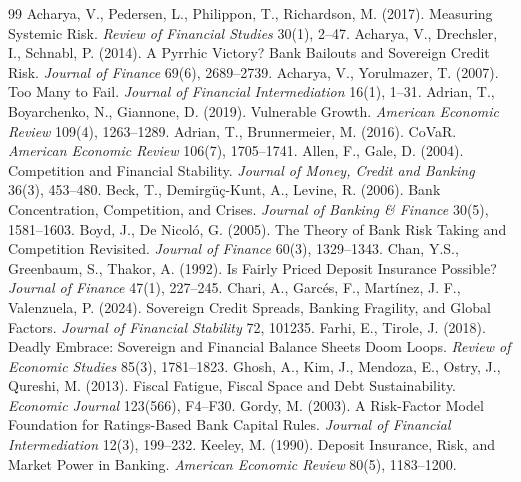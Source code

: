 \begin{thebibliography}{99}
\sloppy\small
{} Acharya, V., Pedersen, L., Philippon, T., Richardson, M. (2017). Measuring Systemic Risk. \textit{Review of Financial Studies} 30(1), 2--47.
 Acharya, V., Drechsler, I., Schnabl, P. (2014). A Pyrrhic Victory? Bank Bailouts and Sovereign Credit Risk. \textit{Journal of Finance} 69(6), 2689--2739.
 Acharya, V., Yorulmazer, T. (2007). Too Many to Fail. \textit{Journal of Financial Intermediation} 16(1), 1--31.
 Adrian, T., Boyarchenko, N., Giannone, D. (2019). Vulnerable Growth. \textit{American Economic Review} 109(4), 1263--1289.
 Adrian, T., Brunnermeier, M. (2016). CoVaR. \textit{American Economic Review} 106(7), 1705--1741.
 Allen, F., Gale, D. (2004). Competition and Financial Stability. \textit{Journal of Money, Credit and Banking} 36(3), 453--480.
 Beck, T., Demirgüç-Kunt, A., Levine, R. (2006). Bank Concentration, Competition, and Crises. \textit{Journal of Banking \& Finance} 30(5), 1581--1603.
 Boyd, J., De Nicoló, G. (2005). The Theory of Bank Risk Taking and Competition Revisited. \textit{Journal of Finance} 60(3), 1329--1343.
 Chan, Y.S., Greenbaum, S., Thakor, A. (1992). Is Fairly Priced Deposit Insurance Possible? \textit{Journal of Finance} 47(1), 227--245.
 Chari, A., Garcés, F., Martínez, J. F., Valenzuela, P. (2024). Sovereign Credit Spreads, Banking Fragility, and Global Factors. \textit{Journal of Financial Stability} 72, 101235.
 Farhi, E., Tirole, J. (2018). Deadly Embrace: Sovereign and Financial Balance Sheets Doom Loops. \textit{Review of Economic Studies} 85(3), 1781--1823.
 Ghosh, A., Kim, J., Mendoza, E., Ostry, J., Qureshi, M. (2013). Fiscal Fatigue, Fiscal Space and Debt Sustainability. \textit{Economic Journal} 123(566), F4--F30.
 Gordy, M. (2003). A Risk-Factor Model Foundation for Ratings-Based Bank Capital Rules. \textit{Journal of Financial Intermediation} 12(3), 199--232.
 Keeley, M. (1990). Deposit Insurance, Risk, and Market Power in Banking. \textit{American Economic Review} 80(5), 1183--1200.

\end{thebibliography}
